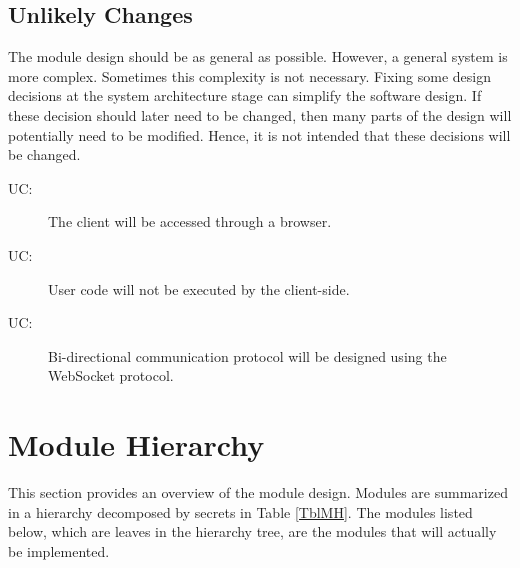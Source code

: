 \documentclass[12pt, titlepage]{article}
\newcounter{ucnum}
\newcommand{\uctheucnum}{UC\theucnum}
\begin{document}
\subsection{Unlikely Changes} \label{SecUchange}

The module design should be as general as possible. However, a general system is
more complex. Sometimes this complexity is not necessary. Fixing some design
decisions at the system architecture stage can simplify the software design. If
these decision should later need to be changed, then many parts of the design
will potentially need to be modified. Hence, it is not intended that these
decisions will be changed.

\begin{description}
\item[ \uctheucnum \label{ucI1}:] The client will be accessed through a browser.
\item[ \uctheucnum \label{ucI2}:] User code will not be executed by the client-side.
\item[ \uctheucnum \label{ucI3}:] Bi-directional communication protocol will be designed using the WebSocket protocol.
\end{description}

\section{Module Hierarchy} \label{SecMH}

This section provides an overview of the module design. Modules are summarized
in a hierarchy decomposed by secrets in Table \ref{TblMH}. The modules listed
below, which are leaves in the hierarchy tree, are the modules that will
actually be implemented.
\end{document}
